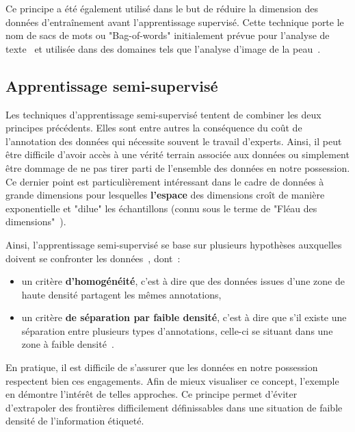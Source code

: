 Ce principe a été également utilisé dans le but de réduire la dimension des données d'entraînement avant l'apprentissage supervisé. Cette technique porte le nom de sacs de mots ou "Bag-of-words" initialement prévue pour l'analyse de texte~\cite{Zhang2010} et utilisée dans des domaines tels que l'analyse d'image de la peau~\cite{Situ2008}.\par

\subsection{Apprentissage semi-supervisé}
\label{sec:semisupervised_learning}
Les techniques d'apprentissage semi-supervisé tentent de combiner les deux principes précédents. Elles sont entre autres la conséquence du coût de l'annotation des données qui nécessite souvent le travail d'experts. Ainsi, il peut être difficile d'avoir accès à une vérité terrain associée aux données ou simplement être dommage de ne pas tirer parti de l'ensemble des données en notre possession. Ce dernier point est particulièrement intéressant dans le cadre de données à grande dimensions pour lesquelles \textbf{l'espace} des dimensions croît de manière exponentielle et "dilue" les échantillons (connu sous le terme de "Fléau des dimensions"~\cite{Donoho2000}).\par 

Ainsi, l'apprentissage semi-supervisé se base sur plusieurs hypothèses auxquelles doivent se confronter les données~\cite{Zhu2009}, dont~:
\begin{itemize}
	\item un critère \textbf{d'homogénéité}, c'est à dire que des données issues d'une zone de haute densité partagent les mêmes annotations, 
	\item un critère \textbf{de séparation par faible densité}, c'est à dire que s'il existe une  séparation entre plusieurs types d'annotations, celle-ci se situant dans une zone à faible densité~\cite{chapelle2005}.
\end{itemize}
En pratique, il est difficile de s'assurer que les données en notre possession respectent bien ces engagements. Afin de mieux visualiser ce concept, l'exemple en  démontre l'intérêt de telles approches. Ce principe permet d'éviter d'extrapoler des frontières difficilement définissables dans une situation de faible densité de l'information étiqueté.\par
 
